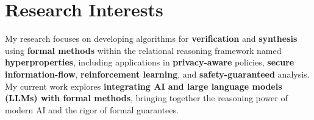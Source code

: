 

\section{Research Interests}

My research focuses on developing algorithms for
{\bf verification} and {\bf synthesis} using {\bf formal methods} within
the relational reasoning framework named {\bf hyperproperties},
including applications in
{\bf privacy-aware} policies,
{\bf secure information-flow},
{\bf reinforcement learning},
and {\bf safety-guaranteed} analysis.
My current work explores {\bf integrating AI and large language models (LLMs) with formal methods},
bringing together the reasoning power of modern AI and the rigor of formal guarantees.\\


